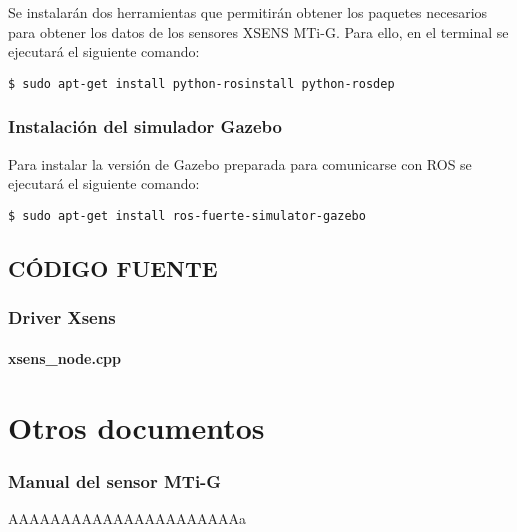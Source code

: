 \documentclass[10pt, a4paper]{report}
\begin{document}
Se instalarán dos herramientas que permitirán obtener los paquetes necesarios para obtener los datos de los sensores XSENS MTi-G. Para ello, en el terminal se ejecutará el siguiente comando:

\begin{verbatim}
$ sudo apt-get install python-rosinstall python-rosdep
\end{verbatim}

\section{Instalación del simulador Gazebo}

Para instalar la versión de Gazebo preparada para comunicarse con ROS se ejecutará el siguiente comando:

\begin{verbatim}
$ sudo apt-get install ros-fuerte-simulator-gazebo
\end{verbatim}


\chapter{CÓDIGO FUENTE}

\section{Driver Xsens}

\subsection{xsens\_node.cpp}
%
\newpage

\part{Otros documentos}

\section{Manual del sensor MTi-G}

%
AAAAAAAAAAAAAAAAAAAAAAa
\end{document}

